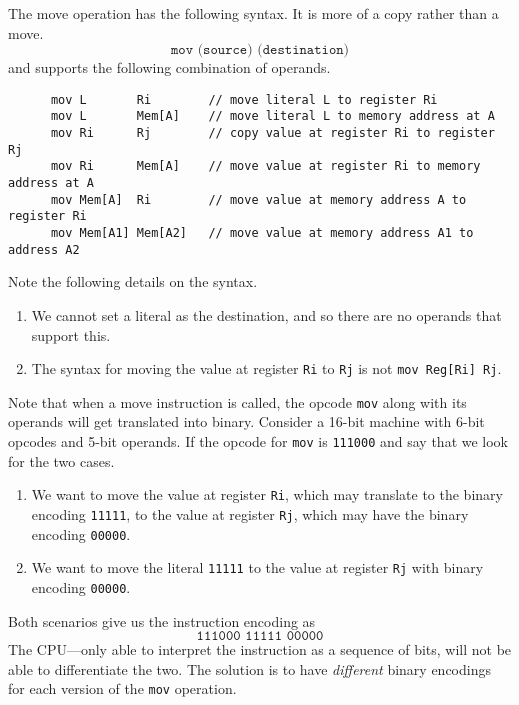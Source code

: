   \begin{definition}
    The move operation has the following syntax. It is more of a copy rather than a move. 
    \begin{equation}
      \texttt{mov (source) (destination)}
    \end{equation}
    and supports the following combination of operands. 
    \begin{lstlisting}
      mov L       Ri        // move literal L to register Ri
      mov L       Mem[A]    // move literal L to memory address at A
      mov Ri      Rj        // copy value at register Ri to register Rj
      mov Ri      Mem[A]    // move value at register Ri to memory address at A 
      mov Mem[A]  Ri        // move value at memory address A to register Ri 
      mov Mem[A1] Mem[A2]   // move value at memory address A1 to address A2 
    \end{lstlisting}
    Note the following details on the syntax. 
    \begin{enumerate}
      \item We cannot set a literal as the destination, and so there are no operands that support this. 
      \item The syntax for moving the value at register \texttt{Ri} to \texttt{Rj} is not \texttt{mov Reg[Ri] Rj}. 
    \end{enumerate}
  \end{definition}

  Note that when a move instruction is called, the opcode \texttt{mov} along with its operands will get translated into binary. Consider a 16-bit machine with 6-bit opcodes and 5-bit operands. If the opcode for \texttt{mov} is \texttt{111000} and say that we look for the two cases. 
  \begin{enumerate}
    \item We want to move the value at register \texttt{Ri}, which may translate to the binary encoding \texttt{11111}, to the value at register \texttt{Rj}, which may have the binary encoding \texttt{00000}. 
    \item We want to move the literal \texttt{11111} to the value at register \texttt{Rj} with binary encoding \texttt{00000}.  
  \end{enumerate}
  Both scenarios give us the instruction encoding as 
  \begin{equation}
    \texttt{111000 11111 00000}
  \end{equation}
  The CPU---only able to interpret the instruction as a sequence of bits, will not be able to differentiate the two. The solution is to have \textit{different} binary encodings for each version of the \texttt{mov} operation. 

